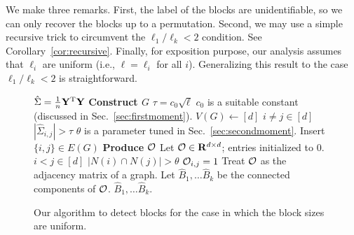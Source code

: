 We make three remarks. First, the label of the blocks are unidentifiable, so we can only recover the blocks up to a permutation. Second, we may use a simple recursive trick to circumvent the $\ell_1 / \ell_k < 2$ condition. See Corollary~\ref{cor:recursive}. Finally, for exposition purpose, our analysis assumes that $\ell_i$ are uniform (i.e., $\ell = \ell_i$ for all $i$). Generalizing this result to the case $\ell_1 / \ell_k < 2$ is straightforward.  


\begin{figure}
{\small
    \centering
    \begin{codebox}
\li $\hat \Sigma = \frac{1}{n}\mathbf{Y}^{\mathrm{T}} \mathbf{Y}$
\li \Comment \textbf{Construct $G$}
\li $\tau = c_0 \sqrt \ell$ \Comment $c_0$ is a suitable constant (discussed in Sec.~\ref{sec:firstmoment}).
\li $V(G) \gets [d]$
\li \For $i \neq j \in [d]$
\li \Do \If $|\hat \Sigma_{i,j}| > \tau$ \Comment $\theta$ is a parameter tuned in Sec.~\ref{sec:secondmoment}.
\li \Then  Insert $\{i, j\} \in E(G)$
\End
\End
\li \Comment \textbf{Produce $\mathcal O$}
\li Let $\mathcal O \in \mathbf{R}^{d \times d}$; entries initialized to $0$.
\li \For $i < j \in [d]$
\li \Do \If $|N(i) \cap N(j)| > \theta$
\li \Then $\mathcal O_{i,j} = 1$
\End
\End
\li Treat $\mathcal O$ as the adjacency matrix of a graph.
\li Let $\hat B_1, \dots \hat B_k$ be the connected components of $\mathcal O$.
\li \Return $\hat B_1, \dots \hat B_k$. 
\end{codebox}
}
\caption{Our algorithm to detect blocks for the case in which the block sizes are uniform.}
    \label{fig:neighbor_algo}
\end{figure}

